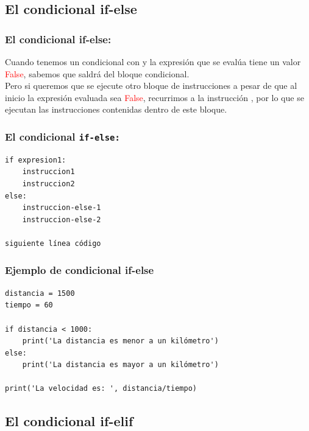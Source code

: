 \documentclass[12pt]{beamer}
\begin{document}
\subsection{El condicional if-else}

\begin{frame}
\frametitle{El condicional if-else:}
Cuando tenemos un condicional con  y la expresión que se evalúa tiene un valor \textcolor{red}{False}, sabemos que saldrá del bloque condicional.
\\
\bigskip
\pause
Pero si queremos que se ejecute otro bloque de instrucciones a pesar de que al inicio la expresión evaluada sea \textcolor{red}{False}, \pause recurrimos a la instrucción , por lo que se ejecutan las instrucciones contenidas dentro de este bloque.
\end{frame}
\begin{frame}[fragile]
\frametitle{El condicional \texttt{if-else:}}
\begin{verbatim}
if expresion1:
    instruccion1
    instruccion2
else:
    instruccion-else-1
    instruccion-else-2

siguiente línea código
\end{verbatim}
\end{frame}
\begin{frame}[fragile]
\frametitle{Ejemplo de condicional if-else}
\begin{lstlisting}[caption=La estructura condicional if-else]
distancia = 1500
tiempo = 60

if distancia < 1000:
    print('La distancia es menor a un kilómetro')
else:
    print('La distancia es mayor a un kilómetro')

print('La velocidad es: ', distancia/tiempo)
\end{lstlisting}
\end{frame}

\subsection{El condicional if-elif}
\end{document}

